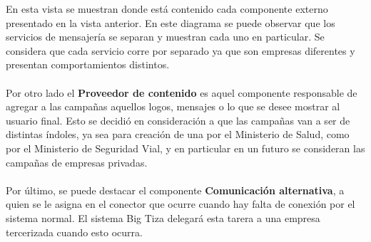 \documentclass[a4paper, 11pt]{article}
\begin{document}
En esta vista se muestran donde está contenido cada componente externo presentado en la vista anterior. En este diagrama se puede observar que los servicios de mensajería se separan y muestran cada uno en particular. Se considera que cada servicio corre por separado ya que son empresas diferentes y presentan comportamientos distintos.\\
\\
Por otro lado el \textbf{Proveedor de contenido} es aquel componente responsable de agregar a las campañas aquellos logos, mensajes o lo que se desee mostrar al usuario final. Esto se decidió en consideración a que las campañas van a ser de distintas índoles, ya sea para creación de una por el Ministerio de Salud, como por el Ministerio de Seguridad Vial, y en particular en un futuro se consideran las campañas de empresas privadas.\\
\\

Por último, se puede destacar el componente \textbf{Comunicación alternativa}, a quien se le asigna en el conector que ocurre cuando hay falta de conexión por el sistema normal. El sistema Big Tiza delegará esta tarera a una empresa tercerizada cuando esto ocurra.


\newpage


\newpage



%
%

\newpage


\end{document}
